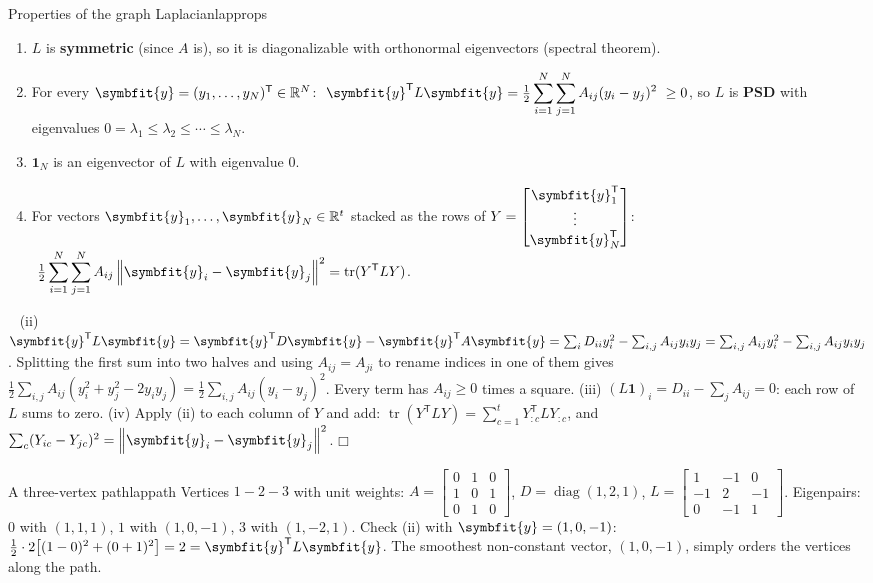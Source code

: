 \documentclass[11pt]{article}
\newcommand{\bm}[1]{\symbfit{#1}}
\newenvironment{proofsketch}{\par\noindent{\itshape Proof.}\ }{\hfill$\mdlgwhtsquare$\par}
\newcommand{\R}{\mathbb{R}}
\newcommand{\one}{\symbf{1}}
\newcommand{\T}{^{\mathsf T}}
\newcommand{\tr}{\operatorname{tr}}
\newcommand{\diag}{\operatorname{diag}}
\newcommand{\norm}[1]{\left\lVert #1\right\rVert}
\begin{document}
\begin{theorem}{Properties of the graph Laplacian}{lapprops}
\begin{enumerate}[nosep,label=(\roman*)]
\item $L$ is \textbf{symmetric} (since $A$ is), so it is diagonalizable with orthonormal eigenvectors (spectral theorem).
\item For every $\bm y=(y_1,\dots,y_N)\T\in\R^N$:
$\ \displaystyle\bm y\T L\bm y=\tfrac12\sum_{i=1}^N\sum_{j=1}^NA_{ij}(y_i-y_j)^2\ \ge0$, so $L$ is \textbf{PSD} with eigenvalues $0=\lambda_1\le\lambda_2\le\cdots\le\lambda_N$.
\item $\one_N$ is an eigenvector of $L$ with eigenvalue $0$.
\item For vectors $\bm y_1,\dots,\bm y_N\in\R^t$ stacked as the rows of $Y=\begin{bmatrix}\bm y_1\T\\\vdots\\\bm y_N\T\end{bmatrix}$:
$\ \displaystyle\tfrac12\sum_{i=1}^N\sum_{j=1}^NA_{ij}\norm{\bm y_i-\bm y_j}^2=\tr(Y\T LY)$.
\end{enumerate}
\end{theorem}
\begin{proofsketch}
(ii) $\bm y\T L\bm y=\bm y\T D\bm y-\bm y\T A\bm y=\sum_iD_{ii}y_i^2-\sum_{i,j}A_{ij}y_iy_j=\sum_{i,j}A_{ij}y_i^2-\sum_{i,j}A_{ij}y_iy_j$. Splitting the first sum into two halves
and using $A_{ij}=A_{ji}$ to rename indices in one of them gives $\tfrac12\sum_{i,j}A_{ij}(y_i^2+y_j^2-2y_iy_j)=\tfrac12\sum_{i,j}A_{ij}(y_i-y_j)^2$. Every term has $A_{ij}\ge0$
times a square. (iii) $(L\one)_i=D_{ii}-\sum_jA_{ij}=0$: each row of $L$ sums to zero. (iv) Apply (ii) to each column of $Y$ and add:
$\tr(Y\T LY)=\sum_{c=1}^t Y_{:c}\T LY_{:c}$, and $\sum_c(Y_{ic}-Y_{jc})^2=\norm{\bm y_i-\bm y_j}^2$.
\end{proofsketch}

\begin{example}{A three-vertex path}{lappath}
Vertices $1-2-3$ with unit weights: $A=\begin{bmatrix}0&1&0\\1&0&1\\0&1&0\end{bmatrix}$, $D=\diag(1,2,1)$, $L=\begin{bmatrix}1&-1&0\\-1&2&-1\\0&-1&1\end{bmatrix}$.
Eigenpairs: $0$ with $(1,1,1)$, $1$ with $(1,0,-1)$, $3$ with $(1,-2,1)$. Check (ii) with $\bm y=(1,0,-1)$: $\tfrac12\cdot2\big[(1-0)^2+(0+1)^2\big]=2=\bm y\T L\bm y$.
The smoothest non-constant vector, $(1,0,-1)$, simply orders the vertices along the path.
\end{example}
\end{document}
